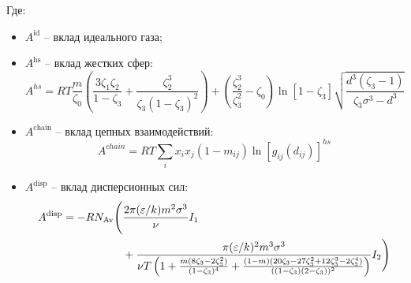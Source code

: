 \documentclass[a4paper,12pt]{article}
\begin{document}
    Где:
    \begin{itemize}
        \item \( A^{\text{id}} \) -- вклад идеального газа;
        \item \( A^{\text{hs}} \) -- вклад жестких сфер:
          \[
          A^{hs} = RT \frac{m}{\zeta_0} \left( \frac{3 \zeta_1 \zeta_2}{1 - \zeta_3} + \frac{\zeta_2^3}{\zeta_3 (1 - \zeta_3)^2} \right) + \left( \frac{\zeta_2^3}{\zeta_3^2} - \zeta_0 \right) \ln [1 - \zeta_3] \sqrt{\frac{d^3 (\zeta_3 - 1)}{\zeta_3 \sigma^3 - d^3}}
          \]
        \item \( A^{\text{chain}} \) -- вклад цепных взаимодействий:
          \[
          A^{chain} = RT \sum_i x_i x_j (1 - m_{ij}) \ln [g_{ij} (d_{ij})]^{hs}
          \]
        \item \( A^{\text{disp}} \) -- вклад дисперсионных сил:
          \begin{align}
          A^{\text{disp}} = -RN_{\text{Av}} \Bigg( & \frac{2 \pi (\varepsilon / k) m^2 \sigma^3}{\nu} I_1 \notag \\
          & + \frac{\pi (\varepsilon / k)^2 m^3 \sigma^3}{\nu T \left(
          1 + \frac{m (8 \zeta_3 - 2 \zeta_3^2)}{(1 - \zeta_3)^4} +
          \frac{(1 - m)(20 \zeta_3 - 27 \zeta_3^2 + 12 \zeta_3^3 - 2 \zeta_3^4)}{((1 - \zeta_3)(2 - \zeta_3))^2}
          \right)} I_2 \Bigg)
          \end{align}
    

\end{itemize}
\end{document}
